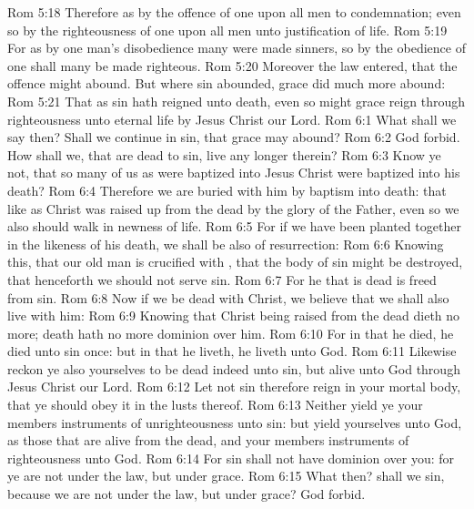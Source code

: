 \vs Rom 5:18 Therefore as by the offence of one  upon all men to condemnation; even so by the righteousness of one  upon all men unto justification of life.
\vs Rom 5:19 For as by one man's disobedience many were made sinners, so by the obedience of one shall many be made righteous.
\vs Rom 5:20 Moreover the law entered, that the offence might abound. But where sin abounded, grace did much more abound:
\vs Rom 5:21 That as sin hath reigned unto death, even so might grace reign through righteousness unto eternal life by Jesus Christ our Lord.
\vs Rom 6:1 What shall we say then? Shall we continue in sin, that grace may abound?
\vs Rom 6:2 God forbid. How shall we, that are dead to sin, live any longer therein?
\vs Rom 6:3 Know ye not, that so many of us as were baptized into Jesus Christ were baptized into his death?
\vs Rom 6:4 Therefore we are buried with him by baptism into death: that like as Christ was raised up from the dead by the glory of the Father, even so we also should walk in newness of life.
\vs Rom 6:5 For if we have been planted together in the likeness of his death, we shall be also  of  resurrection:
\vs Rom 6:6 Knowing this, that our old man is crucified with , that the body of sin might be destroyed, that henceforth we should not serve sin.
\vs Rom 6:7 For he that is dead is freed from sin.
\vs Rom 6:8 Now if we be dead with Christ, we believe that we shall also live with him:
\vs Rom 6:9 Knowing that Christ being raised from the dead dieth no more; death hath no more dominion over him.
\vs Rom 6:10 For in that he died, he died unto sin once: but in that he liveth, he liveth unto God.
\vs Rom 6:11 Likewise reckon ye also yourselves to be dead indeed unto sin, but alive unto God through Jesus Christ our Lord.
\vs Rom 6:12 Let not sin therefore reign in your mortal body, that ye should obey it in the lusts thereof.
\vs Rom 6:13 Neither yield ye your members  instruments of unrighteousness unto sin: but yield yourselves unto God, as those that are alive from the dead, and your members  instruments of righteousness unto God.
\vs Rom 6:14 For sin shall not have dominion over you: for ye are not under the law, but under grace.
\vs Rom 6:15 What then? shall we sin, because we are not under the law, but under grace? God forbid.
